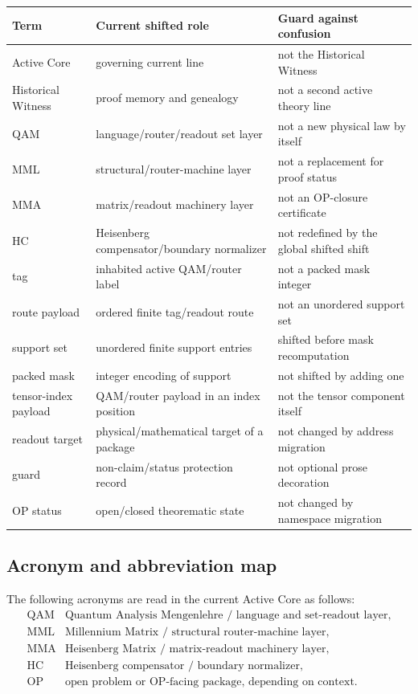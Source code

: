 \begin{center}
\scriptsize
\setlength{\tabcolsep}{2pt}
\begin{tabular}{@{}p{}P{0.35\textwidth}P{0.34\textwidth}@{}}
\toprule
Term & Current shifted role & Guard against confusion\\
\midrule
Active Core & governing current line & not the Historical Witness\\
Historical Witness & proof memory and genealogy & not a second active theory line\\
QAM & language/router/readout set layer & not a new physical law by itself\\
MML & structural/router-machine layer & not a replacement for proof status\\
MMA & matrix/readout machinery layer & not an OP-closure certificate\\
HC & Heisenberg compensator/boundary normalizer & not redefined by the global shifted shift\\
tag & inhabited active QAM/router label & not a packed mask integer\\
route payload & ordered finite tag/readout route & not an unordered support set\\
support set & unordered finite support entries & shifted before mask recomputation\\
packed mask & integer encoding of support & not shifted by adding one\\
tensor-index payload & QAM/router payload in an index position & not the tensor component itself\\
readout target & physical/mathematical target of a package & not changed by address migration\\
guard & non-claim/status protection record & not optional prose decoration\\
OP status & open/closed theorematic state & not changed by namespace migration\\
\bottomrule
\end{tabular}
\end{center}

\subsection{Acronym and abbreviation map}
\label{subsec:v409-acronym-abbreviation-map}

\begin{definition}
\label{def:v409-acronym-map}
The following acronyms are read in the current Active Core as follows:
\[
\begin{array}{ll}
\mathrm{QAM} & \text{Quantum Analysis Mengenlehre / language and set-readout layer},\\
\mathrm{MML} & \text{Millennium Matrix / structural router-machine layer},\\
\mathrm{MMA} & \text{Heisenberg Matrix / matrix-readout machinery layer},\\
\mathrm{HC} & \text{Heisenberg compensator / boundary normalizer},\\
\mathrm{OP} & \text{open problem or OP-facing package, depending on context}.
\end{array}
\]
\end{definition}

